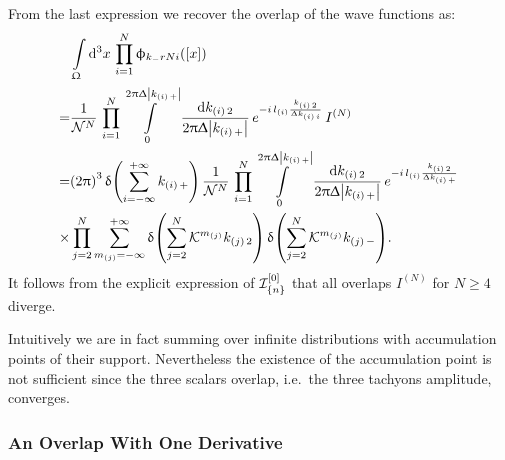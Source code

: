 From the last expression we recover the overlap of the wave functions as:
\begin{equation}
  \begin{split}
    & \int\limits_{\Omega} \dd[3]{x}\,
    \finiteprod{i}{1}{N}   
    \phi_{k_-rN{i}}\qty( \qty[x] )
    \\
    = &
    \frac{1}{\cN^N}\,
    \finiteprod{i}{1}{N}   
    \int\limits_0^{2\pi \Delta \abs{k_{\qty(i)\, +}}}
    \frac{\dd{k_{\qty(i)\, 2}}}{2 \pi \Delta \abs{k_{\qty(i)\, +}}}\,
    e^{%
      -i\, l_{\qty(i)} \frac{k_{\qty(i)\, 2}}{\Delta k_{\qty(i)\, i}}
    }\,
    I^{(N)}
    \\
    = &
    \qty(2\pi)^3\,
    \delta\qty(\infinfsum{i} k_{\qty(i)\, +} )\,
    \frac{1}{\cN^N}\,
    \finiteprod{i}{1}{N}   
    \int\limits_0^{2\pi \Delta \abs{k_{\qty(i)\, +}}}
    \frac{\dd{k_{\qty(i)\, 2}}}{2 \pi \Delta \abs{k_{\qty(i)\, +}}}\,
    e^{%
      -i\, l_{\qty(i)} \frac{k_{\qty(i)\, 2}}{\Delta k_{\qty(i)\, +}}
    }\,
    \\
    \times &
    \finiteprod{j}{2}{N} \infinfsum{m_{(j)}} 
    \delta\qty( \finitesum{j}{2}{N} \cK^{m_{(j)} } k_{\qty(j)\, 2} )\,
    \delta\qty( \finitesum{j}{2}{N} \cK^{m_{(j)} } k_{\qty(j)\, -} ).
  \end{split}
\end{equation}
It follows from the explicit expression of $\mathcal{I}_{\qty{n}}^{\qty[0]}$ that all overlaps $I^{(N)}$ for $N \ge 4$ diverge. 

Intuitively we are in fact summing over infinite distributions with accumulation points of their support.
Nevertheless the existence of the accumulation point is not sufficient since the three scalars overlap, i.e.\ the three tachyons amplitude, converges.


\subsubsection{An Overlap With One Derivative}

